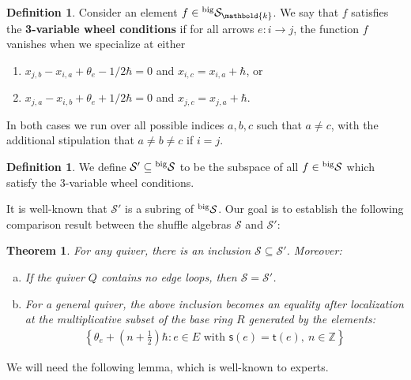 \documentclass[11pt,reqno]{amsart}
\renewcommand{\mathbf}{\mathbold}
\numberwithin{equation}{section}
\newtheorem{Theorem}[equation]{Theorem}
\theoremstyle{definition}
\newtheorem{Definition}[equation]{Definition}
\newcommand{\cS}{\mathcal{S}}
\newcommand{\bk}{\mathbf{k}}
\newcommand{\ZZ}{\mathbb{Z}}
\newcommand{\leftexp}[2]{\vphantom{#2}^{#1} #2}
\newcommand{\source}{\mathsf{s}}
\newcommand{\target}{\mathsf{t}}
\newcommand{\quiver}{Q}
\newcommand{\arrowset}{E}
\newcommand{\base}{R}
\newcommand{\shu}{\cS}
\newcommand{\preshu}{\leftexp{\mathrm{big}}{\cS}}
\begin{document}
\begin{Definition}
    \label{def:3-variable-wheel-conditions}
Consider an element $ f\in \preshu_\bk$.  We say that $f$ satisfies the \textbf{3-variable wheel conditions} if for all arrows $e:i \rightarrow j$, the function  $f$ vanishes when we specialize at either
\begin{enumerate}
\item $x_{j,b}-  x_{i,a} + \theta_e - 1/2 \hbar = 0$ and $x_{i,c} = x_{i,a} + \hbar$, or 
\item $x_{j,a} - x_{i,b}+ \theta_e + 1/2 \hbar = 0$ and $x_{j,c} = x_{j,a} + \hbar$.
\end{enumerate}
In both cases we run over all possible indices $a,b,c$ such that $a \neq c$, with the additional stipulation that $a\neq b \neq c$ if $i = j$.
\end{Definition}


\begin{Definition}
We define  $\shu' \subseteq \preshu$ to be the subspace of all $f \in \preshu$ which  satisfy the $3$-variable  wheel conditions.
\end{Definition}

It is well-known that $\shu'$ is a subring of $\preshu$.  Our goal is to establish the following comparison result between the shuffle algebras $\shu$ and $\shu'$:

\begin{Theorem}
    \label{thm:shufflealgcomparison}
    For any quiver, there is an inclusion $\shu \subseteq \shu'$.   Moreover:
    \begin{enumerate}[(a)]
    \item If the quiver $\quiver$  contains no edge loops, then $\shu = \shu'$.
    \item For a general quiver, the above inclusion becomes an equality after localization at the  multiplicative subset of the base ring $\base$ generated by the elements:
      \begin{align}
        \label{eq:47}
        \left\{ \theta_e + (n+\tfrac{1}{2})\hbar : e \in \arrowset \text{ with } \source(e) = \target(e), \ n \in \ZZ \right\}
      \end{align}
    \end{enumerate}
\end{Theorem}

We will need the following lemma, which is well-known to experts.
\end{document}

